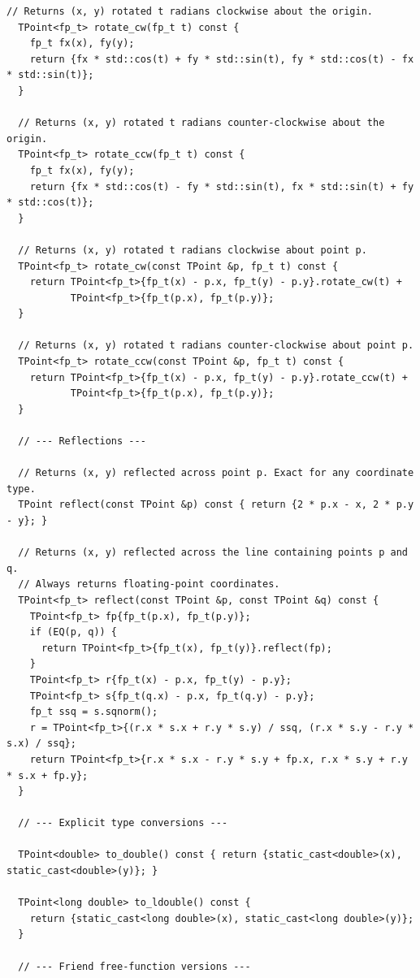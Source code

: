 \begin{lstlisting}[style=cpp]
  // Returns (x, y) rotated t radians clockwise about the origin.
  TPoint<fp_t> rotate_cw(fp_t t) const {
    fp_t fx(x), fy(y);
    return {fx * std::cos(t) + fy * std::sin(t), fy * std::cos(t) - fx * std::sin(t)};
  }

  // Returns (x, y) rotated t radians counter-clockwise about the origin.
  TPoint<fp_t> rotate_ccw(fp_t t) const {
    fp_t fx(x), fy(y);
    return {fx * std::cos(t) - fy * std::sin(t), fx * std::sin(t) + fy * std::cos(t)};
  }

  // Returns (x, y) rotated t radians clockwise about point p.
  TPoint<fp_t> rotate_cw(const TPoint &p, fp_t t) const {
    return TPoint<fp_t>{fp_t(x) - p.x, fp_t(y) - p.y}.rotate_cw(t) +
           TPoint<fp_t>{fp_t(p.x), fp_t(p.y)};
  }

  // Returns (x, y) rotated t radians counter-clockwise about point p.
  TPoint<fp_t> rotate_ccw(const TPoint &p, fp_t t) const {
    return TPoint<fp_t>{fp_t(x) - p.x, fp_t(y) - p.y}.rotate_ccw(t) +
           TPoint<fp_t>{fp_t(p.x), fp_t(p.y)};
  }

  // --- Reflections ---

  // Returns (x, y) reflected across point p. Exact for any coordinate type.
  TPoint reflect(const TPoint &p) const { return {2 * p.x - x, 2 * p.y - y}; }

  // Returns (x, y) reflected across the line containing points p and q.
  // Always returns floating-point coordinates.
  TPoint<fp_t> reflect(const TPoint &p, const TPoint &q) const {
    TPoint<fp_t> fp{fp_t(p.x), fp_t(p.y)};
    if (EQ(p, q)) {
      return TPoint<fp_t>{fp_t(x), fp_t(y)}.reflect(fp);
    }
    TPoint<fp_t> r{fp_t(x) - p.x, fp_t(y) - p.y};
    TPoint<fp_t> s{fp_t(q.x) - p.x, fp_t(q.y) - p.y};
    fp_t ssq = s.sqnorm();
    r = TPoint<fp_t>{(r.x * s.x + r.y * s.y) / ssq, (r.x * s.y - r.y * s.x) / ssq};
    return TPoint<fp_t>{r.x * s.x - r.y * s.y + fp.x, r.x * s.y + r.y * s.x + fp.y};
  }

  // --- Explicit type conversions ---

  TPoint<double> to_double() const { return {static_cast<double>(x), static_cast<double>(y)}; }

  TPoint<long double> to_ldouble() const {
    return {static_cast<long double>(x), static_cast<long double>(y)};
  }

  // --- Friend free-function versions ---


\end{lstlisting}
